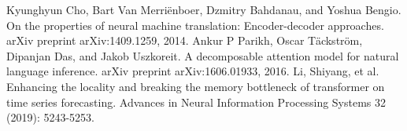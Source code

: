 \documentclass[a4paper,10pt]{my_paper}
\numberwithin{equation}{section}
\begin{document}
\begin{thebibliography}{10}
Kyunghyun  Cho,  Bart  Van  Merriënboer,  Dzmitry  Bahdanau,  and  Yoshua  Bengio.   On  the  properties  of neural  machine  translation:  Encoder-decoder approaches.  arXiv  preprint arXiv:1409.1259, 2014.
Ankur P  Parikh, Oscar  Täckström, Dipanjan  Das, and  Jakob  Uszkoreit.  A  decomposable  attention  model for  natural language  inference.  arXiv  preprint arXiv:1606.01933, 2016.
Li, Shiyang, et al. Enhancing the locality and breaking the memory bottleneck of transformer on time series forecasting. Advances in Neural Information Processing Systems 32 (2019): 5243-5253.

\end{thebibliography}

\newpage

\appendix
\end{document}
